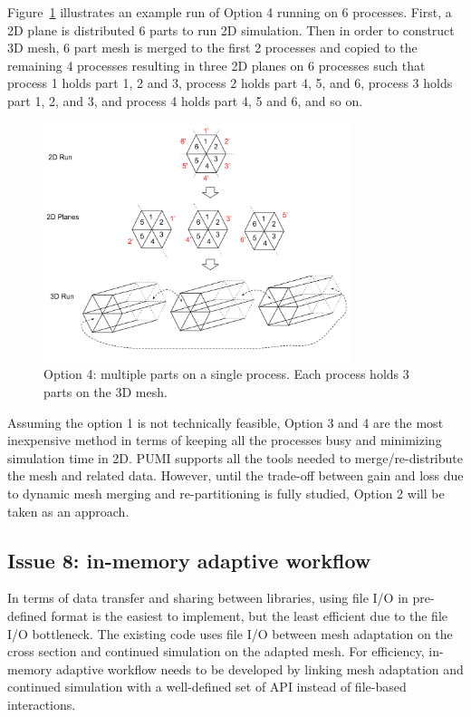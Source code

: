 \documentclass[11pt]{article}  %
\begin{document}
Figure~\ref{fig:wedgePlane2} illustrates an example run of Option 4 running on 6 processes. First, a 2D plane is distributed 6 parts to run 2D simulation. Then in order to construct 3D mesh, 6 part mesh is merged to the first 2 processes and copied to the remaining 4 processes resulting in three 2D planes on 6 processes such that process 1 holds part 1, 2 and 3, process 2 holds part 4, 5, and 6, process 3 holds part 1, 2, and 3, and process 4 holds part 4, 5 and 6, and so on.

\begin{figure}
\center
\includegraphics[width=0.8\textwidth]{fig/wedgePlane2.png}
\caption{\small{Option 4: multiple parts on a single process. Each process holds 3 parts on the 3D mesh.}} 
\label{fig:wedgePlane2}
\end{figure}

Assuming the option 1 is not technically feasible, Option 3 and 4 are the most inexpensive method in terms of keeping all the processes busy and minimizing simulation time in 2D. PUMI supports all the tools needed to merge/re-distribute the mesh and related data. However, until the trade-off between gain and loss due to dynamic mesh merging and re-partitioning is fully studied, Option 2 will be taken as an approach.  

\subsection{Issue 8: in-memory adaptive workflow}

In terms of data transfer and sharing between libraries, using file I/O in pre-defined format is the easiest to implement, but the least efficient due to the file I/O bottleneck. The existing code uses file I/O between mesh adaptation on the cross section and continued simulation on the adapted mesh. 
For efficiency, in-memory adaptive workflow needs to be developed by linking mesh adaptation and continued simulation with a well-defined set of API instead of file-based interactions.
\end{document}
